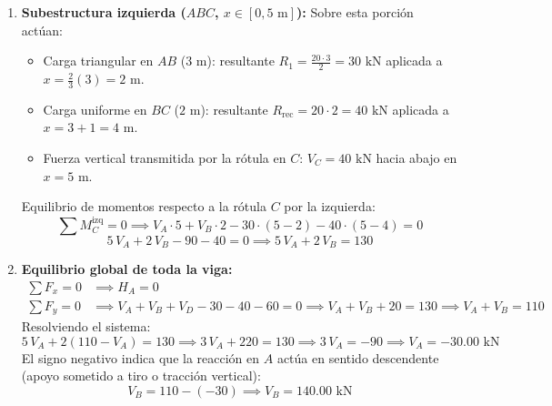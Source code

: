 \begin{enumerate}
    \item \textbf{Subestructura izquierda ($ABC$, $x \in [0, 5\text{ m}]$):}
          Sobre esta porción actúan:
          \begin{itemize}
              \item Carga triangular en $AB$ ($3\text{ m}$): resultante $R_1 = \frac{20 \cdot 3}{2} = 30\text{ kN}$ aplicada a $x = \frac{2}{3}(3) = 2\text{ m}$.
              \item Carga uniforme en $BC$ ($2\text{ m}$): resultante $R_{\text{rec}} = 20 \cdot 2 = 40\text{ kN}$ aplicada a $x = 3 + 1 = 4\text{ m}$.
              \item Fuerza vertical transmitida por la rótula en $C$: $V_C = 40\text{ kN}$ hacia abajo en $x = 5\text{ m}$.
          \end{itemize}
          Equilibrio de momentos respecto a la rótula $C$ por la izquierda:
          \begin{equation}
              \sum M_C^{\text{izq}} = 0 \implies V_A \cdot 5 + V_B \cdot 2 - 30 \cdot (5 - 2) - 40 \cdot (5 - 4) = 0
          \end{equation}
          \begin{equation}
              5\,V_A + 2\,V_B - 90 - 40 = 0 \implies 5\,V_A + 2\,V_B = 130
          \end{equation}

    \item \textbf{Equilibrio global de toda la viga:}
          \begin{align}
              \sum F_x = 0 & \implies \boxed{H_A = 0}                                                                           \\
              \sum F_y = 0 & \implies V_A + V_B + V_D - 30 - 40 - 60 = 0 \implies V_A + V_B + 20 = 130 \implies V_A + V_B = 110
          \end{align}
          Resolviendo el sistema:
          \begin{equation}
              5\,V_A + 2(110 - V_A) = 130 \implies 3\,V_A + 220 = 130 \implies 3\,V_A = -90 \implies \boxed{V_A = -30.00\text{ kN}}
          \end{equation}
          El signo negativo indica que la reacción en $A$ actúa en sentido descendente (apoyo sometido a tiro o tracción vertical):
          \begin{equation}
              V_B = 110 - (-30) \implies \boxed{V_B = 140.00\text{ kN}}
          \end{equation}
\end{enumerate}

